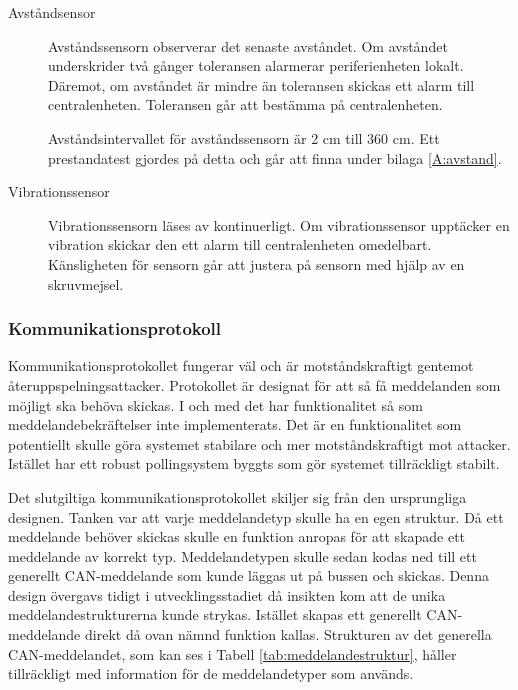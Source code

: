 \documentclass[a4paper]{article}
\newcommand{\todo}[1]{\marginpar{TODO: #1}\vspace{1cm}}
\begin{document}
\begin{description}
  \item[Avståndsensor] Avståndssensorn observerar det senaste avståndet.
  Om avståndet underskrider två gånger toleransen alarmerar periferienheten lokalt.
  Däremot, om avståndet är mindre än toleransen skickas ett alarm till centralenheten.
  Toleransen går att bestämma på centralenheten.

  Avståndsintervallet för avståndssensorn är 2 cm till 360 cm. Ett prestandatest gjordes på detta och går att finna under bilaga \ref{A:avstand}.

  \item[Vibrationssensor] Vibrationssensorn läses av kontinuerligt.
  Om vibrationssensor upptäcker en vibration skickar den ett alarm till centralenheten omedelbart.
  Känsligheten för sensorn går att justera på sensorn med hjälp av en skruvmejsel.

  \end{description}

\subsubsection{Kommunikationsprotokoll}
Kommunikationsprotokollet fungerar väl och är motståndskraftigt gentemot återuppspelningsattacker.
Protokollet är designat för att så få meddelanden som möjligt ska behöva skickas.
I och med det har funktionalitet så som meddelandebekräftelser inte implementerats.
Det är en funktionalitet som potentiellt skulle göra systemet stabilare och mer motståndskraftigt mot attacker.
Istället har ett robust pollingsystem byggts som gör systemet tillräckligt stabilt. %

Det slutgiltiga kommunikationsprotokollet skiljer sig från den ursprungliga designen.
Tanken var att varje meddelandetyp skulle ha en egen struktur.
Då ett meddelande behöver skickas skulle en funktion anropas för att skapade ett meddelande av korrekt typ.
Meddelandetypen skulle sedan kodas ned till ett generellt CAN-meddelande som kunde läggas ut på bussen och skickas.
Denna design övergavs tidigt i utvecklingsstadiet då insikten kom att de unika meddelandestrukturerna kunde strykas.
Istället skapas ett generellt CAN-meddelande direkt då ovan nämnd funktion kallas.
Strukturen av det generella CAN-meddelandet, som kan ses i Tabell \ref{tab:meddelandestruktur}, håller tillräckligt med information för de meddelandetyper som används.
\end{document}
